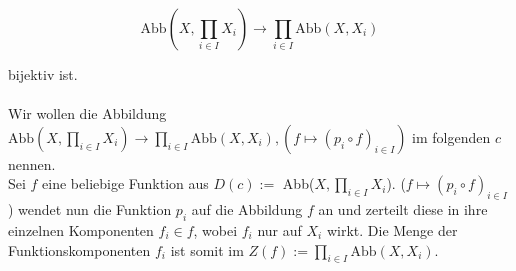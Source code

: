 \documentclass[12pt, letterpaper]{article}
\begin{document}
$$\text{Abb}(X, \prod_{i \in I}X_i) \to \prod_{i \in I}\text{Abb}(X, X_i)$$

\noindent bijektiv ist. \\ \\

\noindent Wir wollen die Abbildung $\text{Abb}(X, \prod_{i \in I}X_i) \to \prod_{i \in I}\text{Abb}(X, X_i), (f \mapsto (p_i \circ f)_{i \in I})$ im folgenden $c$ nennen.\\ 

\noindent Sei $f$ eine beliebige Funktion aus $D(c) :=$ Abb($X, \prod_{i \in I}X_i$). ($f \mapsto (p_i \circ f)_{i \in I}$) wendet nun die Funktion $p_i$ auf die Abbildung $f$ an und zerteilt diese in ihre einzelnen Komponenten $f_i \in f$, wobei $f_i$ nur auf $X_i$ wirkt. Die Menge der Funktionskomponenten $f_i$ ist somit im $Z(f) := \prod_{i \in I}\text{Abb}(X, X_i)$.\\
\end{document}
